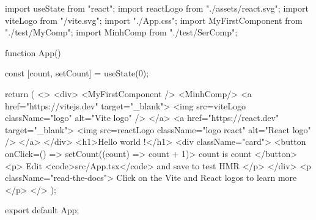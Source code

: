 import { useState } from "react";
import reactLogo from "./assets/react.svg";
import viteLogo from "/vite.svg";
import "./App.css";
import MyFirstComponent from "./test/MyComp";
import MinhComp from "./test/SerComp";

function App() {
  const [count, setCount] = useState(0);

  return (
    <>
      <div>
        <MyFirstComponent />
        <MinhComp/>
        <a href="https://vitejs.dev" target="_blank">
          <img src={viteLogo} className="logo" alt="Vite logo" />
        </a>
        <a href="https://react.dev" target="_blank">
          <img src={reactLogo} className="logo react" alt="React logo" />
        </a>
      </div>
      <h1>Hello world !</h1>
      <div className="card">
        <button onClick={() => setCount((count) => count + 1)}>
          count is {count}
        </button>
        <p>
          Edit <code>src/App.tsx</code> and save to test HMR
        </p>
      </div>
      <p className="read-the-docs">
        Click on the Vite and React logos to learn more
      </p>
    </>
  );
}

export default App;
